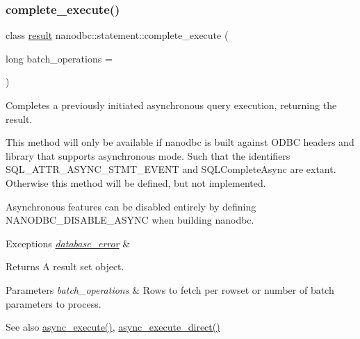 \subsubsection{\texorpdfstring{complete\_execute()}{complete\_execute()}}
{\footnotesize\ttfamily class \mbox{\hyperlink{classnanodbc_1_1result}{result}} nanodbc\+::statement\+::complete\+\_\+execute (\begin{DoxyParamCaption}\item[{long}]{batch\+\_\+operations = {} }\end{DoxyParamCaption})}



Completes a previously initiated asynchronous query execution, returning the result. 

This method will only be available if nanodbc is built against O\+D\+BC headers and library that supports asynchronous mode. Such that the identifiers {\ttfamily S\+Q\+L\+\_\+\+A\+T\+T\+R\+\_\+\+A\+S\+Y\+N\+C\+\_\+\+S\+T\+M\+T\+\_\+\+E\+V\+E\+NT} and {\ttfamily S\+Q\+L\+Complete\+Async} are extant. Otherwise this method will be defined, but not implemented.

Asynchronous features can be disabled entirely by defining {\ttfamily N\+A\+N\+O\+D\+B\+C\+\_\+\+D\+I\+S\+A\+B\+L\+E\+\_\+\+A\+S\+Y\+NC} when building nanodbc.


\begin{DoxyExceptions}{Exceptions}
{\em \mbox{\hyperlink{classnanodbc_1_1database__error}{database\+\_\+error}}} & \\
\hline
\end{DoxyExceptions}
\begin{DoxyReturn}{Returns}
A result set object. 
\end{DoxyReturn}

\begin{DoxyParams}{Parameters}
{\em batch\+\_\+operations} & Rows to fetch per rowset or number of batch parameters to process. \\
\hline
\end{DoxyParams}
\begin{DoxySeeAlso}{See also}
\mbox{\hyperlink{classnanodbc_1_1statement_ac7086dafc8c0f014c629d15f97cc9505}{async\+\_\+execute()}}, \mbox{\hyperlink{classnanodbc_1_1statement_a34184874a281b654f685b2f351956302}{async\+\_\+execute\+\_\+direct()}} 
\end{DoxySeeAlso}
\mbox{\label{classnanodbc_1_1statement_a416c39007e292cf9b95f368d829ad5cb}} 

